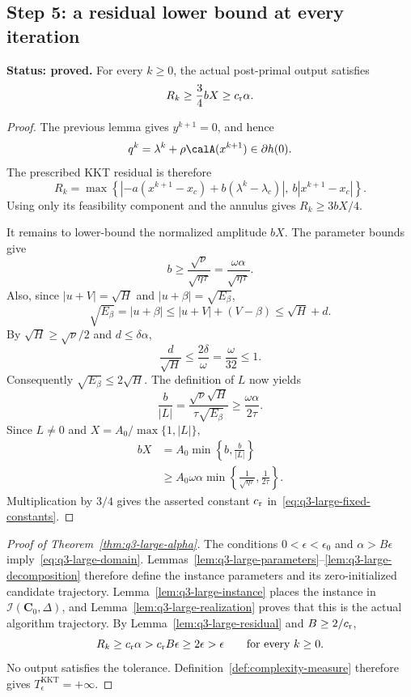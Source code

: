 \subsection{Step 5: a residual lower bound at every iteration}
\label{subsec:q3-large-residual}

\begin{lemma}
\label{lem:q3-large-residual}
\textbf{Status: proved.}
For every \(k\ge0\), the actual post-primal output satisfies
\[
R_k\ge\frac34 bX\ge c_{\rm r}\alpha.
\]
\end{lemma}

\begin{proof}
The previous lemma gives \(y^{k+1}=0\), and hence
\[
q^k=\lambda^k+\rho\calA(x^{k+1})\in\partial h(0).
\]
The prescribed KKT residual is therefore
\[
R_k=\max\left\{
\left|-a(x^{k+1}-x_c)+b(\lambda^k-\lambda_c)\right|,
\ b|x^{k+1}-x_c|\right\}.
\]
Using only its feasibility component and the annulus gives
\(R_k\ge3bX/4\).

It remains to lower-bound the normalized amplitude \(bX\).
The parameter bounds give
\[
b\ge\frac{\sqrt{\nu}}{\sqrt{\eta\tau}}
=\frac{\omega\alpha}{\sqrt{\eta\tau}}.
\]
Also, since \(|u+V|=\sqrt H\) and
\(|u+\beta|=\sqrt{E_\beta}\),
\[
\sqrt{E_\beta}=|u+\beta|
\le|u+V|+(V-\beta)\le\sqrt H+d.
\]
By \(\sqrt H\ge\sqrt\nu/2\) and \(d\le\delta\alpha\),
\[
\frac{d}{\sqrt H}
\le\frac{2\delta}{\omega}=\frac{\omega}{32}\le1.
\]
Consequently \(\sqrt{E_\beta}\le2\sqrt H\).
The definition of \(L\) now yields
\[
\frac{b}{|L|}
=\frac{\sqrt\nu\sqrt H}{\tau\sqrt{E_\beta}}
\ge\frac{\omega\alpha}{2\tau}.
\]
Since \(L\ne0\) and \(X=A_0/\max\{1,|L|\}\),
\[
\begin{aligned}
bX
&=A_0\min\left\{b,\frac{b}{|L|}\right\}\\
&\ge A_0\omega\alpha
\min\left\{\frac{1}{\sqrt{\eta\tau}},\frac{1}{2\tau}\right\}.
\end{aligned}
\]
Multiplication by \(3/4\) gives the asserted constant
\(c_{\rm r}\) in~\eqref{eq:q3-large-fixed-constants}.
\end{proof}

\begin{proof}[Proof of Theorem~\ref{thm:q3-large-alpha}]
The conditions \(0<\epsilon<\epsilon_0\) and
\(\alpha>B\epsilon\) imply~\eqref{eq:q3-large-domain}.
Lemmas~\ref{lem:q3-large-parameters}--\ref{lem:q3-large-decomposition}
therefore define the instance parameters and its zero-initialized
candidate trajectory. Lemma~\ref{lem:q3-large-instance} places the
instance in \(\mathcal I(\mathbf C_0,\Delta)\), and
Lemma~\ref{lem:q3-large-realization} proves that this is the actual
algorithm trajectory. By Lemma~\ref{lem:q3-large-residual} and
\(B\ge2/c_{\rm r}\),
\[
R_k\ge c_{\rm r}\alpha
>c_{\rm r}B\epsilon\ge2\epsilon>\epsilon
\qquad\text{for every }k\ge0.
\]
No output satisfies the tolerance. Definition~\ref{def:complexity-measure}
therefore gives \(T^{\mathrm{KKT}}_\epsilon=+\infty\).
\end{proof}

